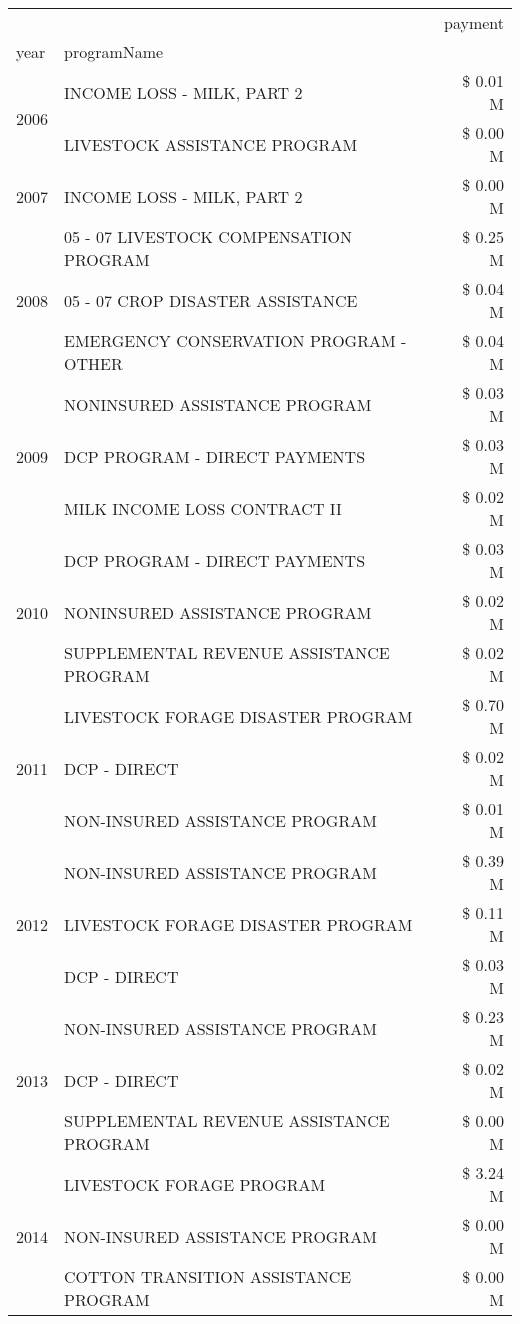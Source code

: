 \begin{tabular}{llr}
\toprule
 &  & payment \\
year & programName &  \\
\midrule
\multirow[t]{2}{*}{2006} & INCOME LOSS - MILK, PART 2 & \$ 0.01 M \\
 & LIVESTOCK ASSISTANCE PROGRAM & \$ 0.00 M \\
\cline{1-3}
2007 & INCOME LOSS - MILK, PART 2 & \$ 0.00 M \\
\cline{1-3}
\multirow[t]{3}{*}{2008} & 05 - 07 LIVESTOCK COMPENSATION PROGRAM & \$ 0.25 M \\
 & 05 - 07 CROP DISASTER ASSISTANCE & \$ 0.04 M \\
 & EMERGENCY CONSERVATION PROGRAM - OTHER & \$ 0.04 M \\
\cline{1-3}
\multirow[t]{3}{*}{2009} & NONINSURED ASSISTANCE PROGRAM & \$ 0.03 M \\
 & DCP PROGRAM - DIRECT PAYMENTS & \$ 0.03 M \\
 & MILK INCOME LOSS CONTRACT II & \$ 0.02 M \\
\cline{1-3}
\multirow[t]{3}{*}{2010} & DCP PROGRAM - DIRECT PAYMENTS & \$ 0.03 M \\
 & NONINSURED ASSISTANCE PROGRAM & \$ 0.02 M \\
 & SUPPLEMENTAL REVENUE ASSISTANCE PROGRAM & \$ 0.02 M \\
\cline{1-3}
\multirow[t]{3}{*}{2011} & LIVESTOCK FORAGE DISASTER PROGRAM & \$ 0.70 M \\
 & DCP - DIRECT & \$ 0.02 M \\
 & NON-INSURED ASSISTANCE PROGRAM & \$ 0.01 M \\
\cline{1-3}
\multirow[t]{3}{*}{2012} & NON-INSURED ASSISTANCE PROGRAM & \$ 0.39 M \\
 & LIVESTOCK FORAGE DISASTER PROGRAM & \$ 0.11 M \\
 & DCP - DIRECT & \$ 0.03 M \\
\cline{1-3}
\multirow[t]{3}{*}{2013} & NON-INSURED ASSISTANCE PROGRAM & \$ 0.23 M \\
 & DCP - DIRECT & \$ 0.02 M \\
 & SUPPLEMENTAL REVENUE ASSISTANCE PROGRAM & \$ 0.00 M \\
\cline{1-3}
\multirow[t]{3}{*}{2014} & LIVESTOCK FORAGE PROGRAM & \$ 3.24 M \\
 & NON-INSURED ASSISTANCE PROGRAM & \$ 0.00 M \\
 & COTTON TRANSITION ASSISTANCE PROGRAM & \$ 0.00 M \\

\end{tabular}

